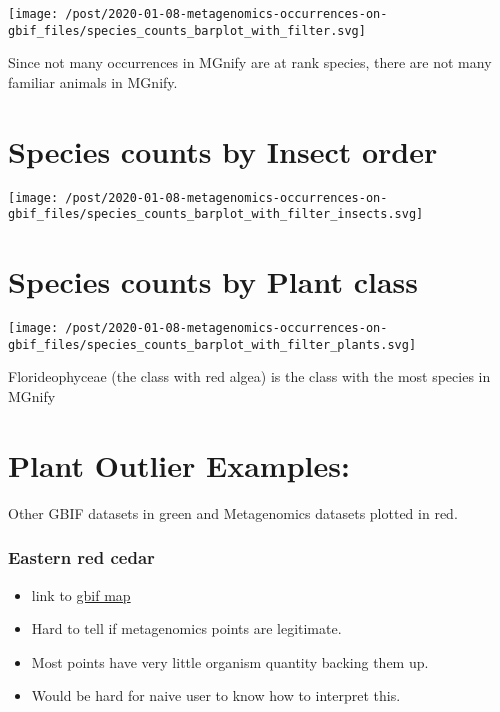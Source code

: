 \documentclass[]{article}
\providecommand{\tightlist}{%
  \setlength{\itemsep}{0pt}\setlength{\parskip}{0pt}}
\begin{document}
\texttt{[image: /post/2020-01-08-metagenomics-occurrences-on-gbif\_files/species\_counts\_barplot\_with\_filter.svg]}

Since not many occurrences in MGnify are at rank species, there are not
many familiar animals in MGnify.

\hypertarget{species-counts-by-insect-order}{%
\section{Species counts by Insect
order}\label{species-counts-by-insect-order}}

\texttt{[image: /post/2020-01-08-metagenomics-occurrences-on-gbif\_files/species\_counts\_barplot\_with\_filter\_insects.svg]}

\hypertarget{species-counts-by-plant-class}{%
\section{Species counts by Plant
class}\label{species-counts-by-plant-class}}

\texttt{[image: /post/2020-01-08-metagenomics-occurrences-on-gbif\_files/species\_counts\_barplot\_with\_filter\_plants.svg]}

Florideophyceae (the class with red algea) is the class with the most
species in MGnify

\hypertarget{plant-outlier-examples}{%
\section{Plant Outlier Examples:}\label{plant-outlier-examples}}

Other {GBIF datasets} in green and {Metagenomics datasets} plotted in
red.

\hypertarget{eastern-red-cedar}{%
\subsubsection{Eastern red cedar}\label{eastern-red-cedar}}

\begin{itemize}
\tightlist
\item
  link to
  \href{https://www.gbif.org/occurrence/map?taxon_key=2684391}{gbif map}
\item
  Hard to tell if {metagenomics points} are legitimate.
\item
  Most points have very little organism quantity backing them up.
\item
  Would be hard for naive user to know how to interpret this.
\end{itemize}
\end{document}
